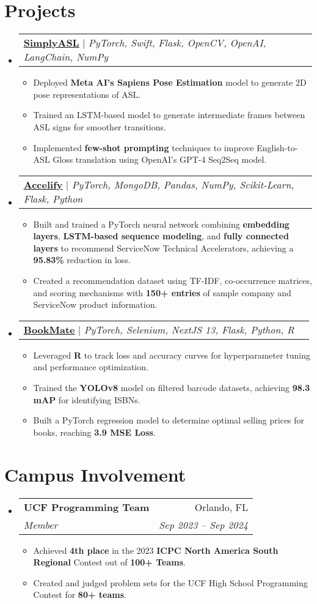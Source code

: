 \documentclass[letterpaper,11pt]{article}
\makeatletter
\newcommand{\resumeItem}[1]{
  \item\small{
    {#1 \vspace{-2pt}}
  }
}
\newcommand{\resumeSubheading}[4]{
  \vspace{-2pt}\item
    \begin{tabular*}{0.97\textwidth}[t]{l@{\extracolsep{\fill}}r}
      \textbf{#1} & #2 \\
      \textit{\small#3} & \textit{\small #4} \\
    \end{tabular*}\vspace{-7pt}
}
\newcommand{\resumeProjectHeading}[2]{
    \item
    \begin{tabular*}{0.97\textwidth}{l@{\extracolsep{\fill}}r}
      \small#1 & #2 \\
    \end{tabular*}\vspace{-7pt}
}
\newcommand{\resumeSubHeadingListStart}{\begin{itemize}[leftmargin=0.15in, label={}]}
\newcommand{\resumeSubHeadingListEnd}{\end{itemize}}
\newcommand{\resumeItemListStart}{\begin{itemize}}
\newcommand{\resumeItemListEnd}{\end{itemize}\vspace{-5pt}}
\makeatother
\begin{document}
\section{Projects}
  \resumeSubHeadingListStart
    \resumeProjectHeading
      {\href{https://github.com/DRobinson4105/Simply-ASL}{\textbf{\uline{SimplyASL}}} $|$ \emph{PyTorch, Swift, Flask, OpenCV, OpenAI, LangChain, NumPy}}{}
      \resumeItemListStart
        \resumeItem{Deployed \textbf{Meta AI’s Sapiens Pose Estimation} model to generate 2D pose representations of ASL.}
        \resumeItem{Trained an LSTM-based model to generate intermediate frames between ASL signs for smoother transitions.}
        \resumeItem{Implemented \textbf{few-shot prompting} techniques to improve English-to-ASL Gloss translation using OpenAI's GPT-4 Seq2Seq model.}
      \resumeItemListEnd
    \resumeProjectHeading
      {\href{https://github.com/DRobinson4105/accelify}{\textbf{\uline{Accelify}}} $|$ \emph{PyTorch, MongoDB, Pandas, NumPy, Scikit-Learn, Flask, Python}}{}
      \resumeItemListStart
        \resumeItem{Built and trained a PyTorch neural network combining \textbf{embedding layers}, \textbf{LSTM-based sequence modeling}, and \textbf{fully connected layers} to recommend ServiceNow Technical Accelerators, achieving a \textbf{95.83\%} reduction in loss.}
        \resumeItem{Created a recommendation dataset using TF-IDF, co-occurrence matrices, and scoring mechanisms with \textbf{150+ entries} of sample company and ServiceNow product information.}
      \resumeItemListEnd
    \resumeProjectHeading
      {\href{https://github.com/DRobinson4105/bookmate}{\textbf{\uline{BookMate}}} $|$ \emph{PyTorch, Selenium, NextJS 13, Flask, Python, R}}{}
      \resumeItemListStart
        \resumeItem{Leveraged \textbf{R} to track loss and accuracy curves for hyperparameter tuning and performance optimization.}
        \resumeItem{Trained the \textbf{YOLOv8} model on filtered barcode datasets, achieving \textbf{98.3 mAP} for identifying ISBNs.}
        \resumeItem{Built a PyTorch regression model to determine optimal selling prices for books, reaching \textbf{3.9 MSE Loss}.}
      \resumeItemListEnd
  \resumeSubHeadingListEnd
\section{Campus Involvement}
  \resumeSubHeadingListStart
    \resumeSubheading
      {UCF Programming Team}{Orlando, FL}
      {Member}{Sep 2023 -- Sep 2024}
      \resumeItemListStart
        \resumeItem{Achieved \textbf{4th place} in the 2023 \textbf{ICPC North America South Regional} Contest out of \textbf{100+ Teams}.}
        \resumeItem{Created and judged problem sets for the UCF High School Programming Contest for \textbf{80+ teams}.}
      \resumeItemListEnd
  \resumeSubHeadingListEnd
\end{document}
